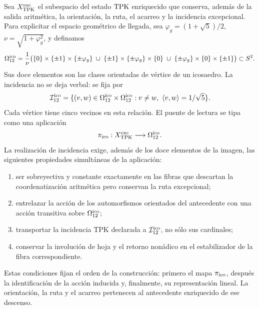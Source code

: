 Sea \(X_{\rm TPK}^{\rm exc}\) el subespacio del estado \(\mathrm{TPK}\) enriquecido
que conserva, adem\'as de la salida aritm\'etica, la orientaci\'on, la ruta,
el acarreo y la incidencia excepcional. Para explicitar el espacio geom\'etrico de llegada,
sea \(\varphi_g=(1+\sqrt5)/2\), \(\nu=\sqrt{1+\varphi_g^2}\), y definamos
\begin{equation}
\label{ii:pent:eq:gravity-icosahedron-vertices}
\Omega_{12}^{\rm ico}
=\frac1\nu\bigl(
\{0\}\times\{\pm1\}\times\{\pm\varphi_g\}
\;\cup\;
\{\pm1\}\times\{\pm\varphi_g\}\times\{0\}
\;\cup\;
\{\pm\varphi_g\}\times\{0\}\times\{\pm1\}
\bigr)\subset S^2.
\end{equation}
Sus doce elementos son las clases orientadas de v\'ertice de un icosaedro.
La incidencia no se deja verbal: se fija por
\begin{equation}
\label{ii:pent:eq:gravity-icosahedron-incidence}
\mathcal I_{12}^{\rm ico}
=\{(v,w)\in\Omega_{12}^{\rm ico}\times\Omega_{12}^{\rm ico}:
v\neq w,\ \langle v,w\rangle=1/\sqrt5\}.
\end{equation}
Cada v\'ertice tiene cinco vecinos en esta relaci\'on. El puente de lectura
se tipa como una aplicaci\'on
\begin{equation}
\label{ii:pent:eq:gravity-exceptional-reader-map}
\pi_{\rm ico}:X_{\rm TPK}^{\rm exc}\longrightarrow\Omega_{12}^{\rm ico}.
\end{equation}
La realización de incidencia exige, además de los doce elementos de la
imagen, las siguientes propiedades simultáneas de la aplicación:
\begin{enumerate}[label=(\roman*)]
\item ser sobreyectiva y constante exactamente en las fibras que descartan
la coordenatización aritm\'etica pero conservan la ruta excepcional;
\item entrelazar la acci\'on de los automorfismos orientados del antecedente
con una acci\'on transitiva sobre \(\Omega_{12}^{\rm ico}\);
\item transportar la incidencia TPK declarada a
\(\mathcal I_{12}^{\rm ico}\), no
s\'olo sus cardinales;
\item conservar la involuci\'on de hoja y el retorno non\'adico en el
estabilizador de la fibra correspondiente.
\end{enumerate}

Estas condiciones fijan el orden de la construcción: primero el mapa
\(\pi_{\rm ico}\), después la identificación de la acción inducida y,
finalmente, su representación lineal. La orientación, la ruta y el acarreo
pertenecen al antecedente enriquecido de ese descenso.

